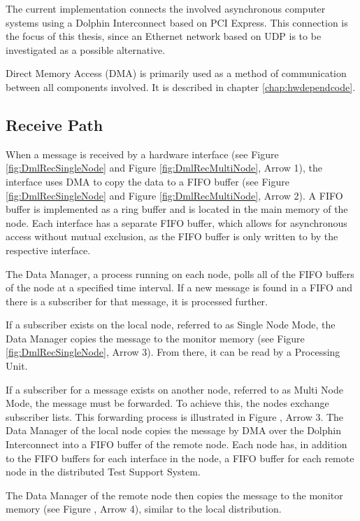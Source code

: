 The current implementation connects the involved asynchronous computer systems using a Dolphin Interconnect based on PCI Express. This connection is the focus of this thesis, since an Ethernet network based on UDP is to be investigated as a possible alternative.

Direct Memory Access (DMA) is primarily used as a method of communication between all components involved. It is described in chapter \ref{chap:hwdependcode}.

\subsection{Receive Path}

When a message is received by a hardware interface (see Figure \ref{fig:DmlRecSingleNode} and Figure \ref{fig:DmlRecMultiNode}, Arrow 1), the interface uses DMA to copy the data to a FIFO buffer (see Figure \ref{fig:DmlRecSingleNode} and Figure \ref{fig:DmlRecMultiNode}, Arrow 2). A FIFO buffer is implemented as a ring buffer and is located in the main memory of the node. Each interface has a separate FIFO buffer, which allows for asynchronous access without mutual exclusion, as the FIFO buffer is only written to by the respective interface.

The Data Manager, a process running on each node, polls all of the FIFO buffers of the node at a specified time interval. If a new message is found in a FIFO and there is a subscriber for that message, it is processed further.

If a subscriber exists on the local node, referred to as Single Node Mode, the Data Manager copies the message to the monitor memory (see Figure \ref{fig:DmlRecSingleNode}, Arrow 3). From there, it can be read by a Processing Unit.

If a subscriber for a message exists on another node, referred to as Multi Node Mode, the message must be forwarded. To achieve this, the nodes exchange subscriber lists. This forwarding process is illustrated in Figure \label{fig:DmlRecMultiNode}, Arrow 3. The Data Manager of the local node copies the message by DMA over the Dolphin Interconnect into a FIFO buffer of the remote node. Each node has, in addition to the FIFO buffers for each interface in the node, a FIFO buffer for each remote node in the distributed Test Support System.

The Data Manager of the remote node then copies the message to the monitor memory (see Figure \label{fig:DmlRecMultiNode}, Arrow 4), similar to the local distribution.

